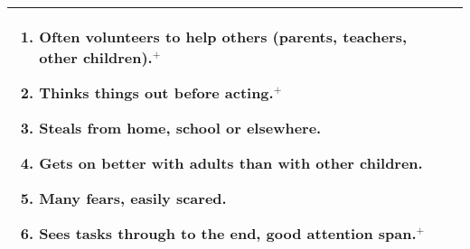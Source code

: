 \begin{table}[ht!]
\begin{tabular}{L{.46\linewidth}L{.001\linewidth}L{.46\linewidth}}
\begin{enumerate}
\item Often volunteers to help others (parents, teachers, other children).$^+$
\item Thinks things out before acting.$^+$
\item Steals from home, school or elsewhere.
\item Gets on better with adults than with other children.
\item Many fears, easily scared.
\item Sees tasks through to the end, good attention span.$^+$
\end{enumerate}
\\
\bottomrule
\end{tabular}
\end{table}

